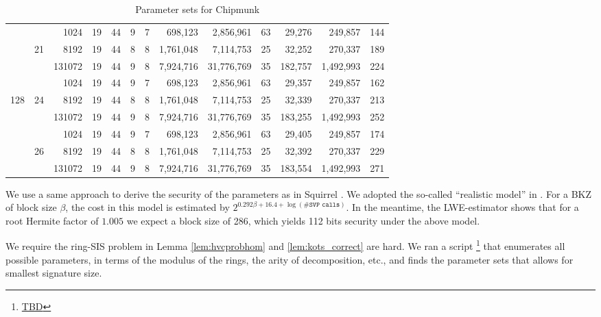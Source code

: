 \begin{table}
\begin{tabular}{|c|c|r||c|c||c|c|r|r||c||r|r||c|}
    &       &   1024 &         19 &        44 &          9 &       7 &        698,123 &  2,856,961 &    63 &       29,276 &   249,857 & 144 \\\cline{3-13}
    &    21 &   8192 &         19 &        44 &          8 &       8 &      1,761,048 &  7,114,753 &    25 &       32,252 &   270,337 & 189 \\\cline{3-13}
    &       & 131072 &         19 &        44 &          9 &       8 &      7,924,716 & 31,776,769 &    35 &      182,757 & 1,492,993 & 224 \\\cline{2-13}

    &       &   1024 &         19 &        44 &          9 &       7 &        698,123 &  2,856,961 &    63 &       29,357 &   249,857 & 162 \\\cline{3-13}
128 &    24 &   8192 &         19 &        44 &          8 &       8 &      1,761,048 &  7,114,753 &    25 &       32,339 &   270,337 & 213 \\\cline{3-13}
    &       & 131072 &         19 &        44 &          9 &       8 &      7,924,716 & 31,776,769 &    35 &      183,255 & 1,492,993 & 252 \\\cline{2-13}

    &       &   1024 &         19 &        44 &          9 &       7 &        698,123 &  2,856,961 &    63 &       29,405 &   249,857 & 174 \\\cline{3-13}
    &    26 &   8192 &         19 &        44 &          8 &       8 &      1,761,048 &  7,114,753 &    25 &       32,392 &   270,337 & 229 \\\cline{3-13}
    &       & 131072 &         19 &        44 &          9 &       8 &      7,924,716 & 31,776,769 &    35 &      183,554 & 1,492,993 & 271 \\\hline
  \end{tabular}
  \caption{Parameter sets for Chipmunk}
\end{table}


We use a same approach to derive the security of the parameters as in Squirrel \cite{CCS:FleSimZha22}.
We adopted the so-called ``realistic model'' in \cite{DBLP:conf/uss/AlkimDPS16}.
For a BKZ of block size $\beta$, the cost in this model is estimated by
$2^{0.292\beta+16.4+\log(\#\texttt{SVP calls})}$. 
In the meantime, the LWE-estimator \cite{DBLP:journals/jmc/AlbrechtPS15}
shows that for a root Hermite factor of $1.005$ we expect a block size of 286, which yields 112 bits security under the above model. 

We require the ring-SIS problem in Lemma \ref{lem:hvcprobhom} and \ref{lem:kots_correct} are hard. We ran a script \footnote{\url{TBD}}
that enumerates all possible 
parameters, in terms of the modulus of the rings, the arity of decomposition, etc., and finds the parameter sets that
allows for smallest signature size.

